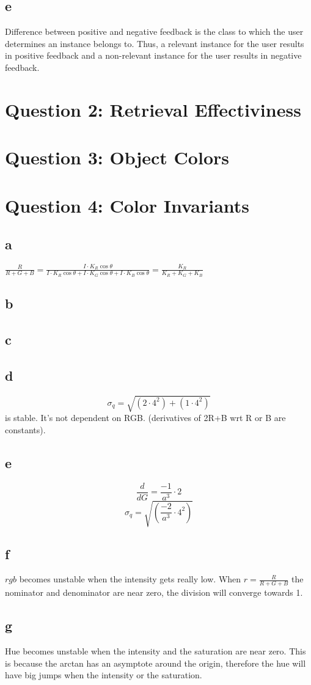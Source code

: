 \documentclass[a4paper,11pt]{article}
\newcommand{\ds}{\displaystyle}
\begin{document}
	\subsection*{e}
	Difference between positive and negative feedback is the class to which the user determines an instance belongs to. Thus, a relevant instance for the user results in positive feedback and a non-relevant instance  for the user results in negative feedback.
	
	\section*{Question 2: Retrieval Effectiviness}
	
	\section*{Question 3: Object Colors}
	
	\section*{Question 4: Color Invariants}
	\subsection*{a}
		$\ds\frac{R}{R + G + B} = \ds\frac{I \cdot K_R \cos \theta}{I \cdot K_R \cos \theta + I \cdot K_G \cos \theta + I \cdot K_B \cos \theta} = \ds\frac{K_R}{K_R + K_G + K_B}$
	\subsection*{b}
	\subsection*{c}
	
	\subsection*{d}
	\[\sigma_q = \sqrt{(2\cdot4^2)+(1\cdot4^2)}\] 
	is stable. It's not dependent on RGB. (derivatives of 2R+B wrt R or B are constants).
	\subsection*{e}
	\[\frac{d}{dG}=\frac{-1}{a^3}\cdot 2\]
	\[\sigma_q = \sqrt{(\frac{-2}{a^3}\cdot4^2)}\] 	
	\subsection*{f}
		$rgb$ becomes unstable when the intensity gets really low. When $r=\frac{R}{R+G+B}$ the nominator and denominator are near zero, the division will converge towards 1.
	\subsection*{g}
		Hue becomes unstable when the intensity and the saturation are near zero. This is because the arctan has an asymptote around the origin, therefore the hue will have big jumps when the intensity or the saturation.
\end{document}
